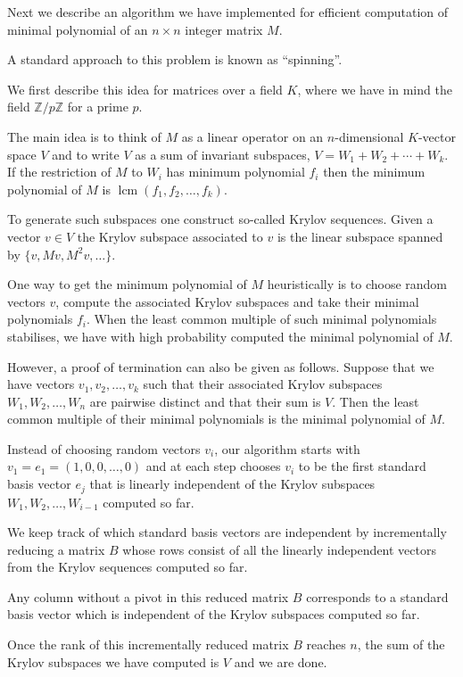 \documentclass{sig-alternate-05-2015}
\DeclareMathOperator{\lcm}{lcm}
\begin{document}
Next we describe an algorithm we have implemented for efficient
computation of minimal polynomial of an $n\times n$ integer matrix $M$.

A standard approach to this problem is known as ``spinning''. 

We first describe this idea for matrices over a field $K$, where we have
in mind the field $\mathbb{Z}/p\mathbb{Z}$ for a prime $p$.

The main idea is to think of $M$ as a linear operator on an $n$-dimensional
$K$-vector space $V$ and to write $V$ as a sum of invariant subspaces, 
$V = W_1 + W_2 + \cdots + W_k$. If the restriction of $M$ to $W_i$ has
minimum polynomial $f_i$ then the minimum polynomial of $M$ is
$\lcm(f_1, f_2, \ldots, f_k)$.

To generate such subspaces one construct so-called Krylov sequences. Given
a vector $v \in V$ the Krylov subspace associated to $v$ is the linear
subspace spanned by $\{v, Mv, M^2v, \ldots\}$.

One way to get the minimum polynomial of $M$ heuristically is to choose
random vectors $v$, compute the associated Krylov subspaces and take their
minimal polynomials $f_i$. When the least common multiple of such minimal
polynomials stabilises, we have with high probability computed the minimal
polynomial of $M$.

However, a proof of termination can also be given as follows. Suppose that
we have vectors $v_1, v_2, \ldots, v_k$ such that their associated Krylov
subspaces $W_1, W_2, \ldots, W_n$ are pairwise distinct and that their
sum is $V$. Then the least common multiple of their minimal polynomials is
the minimal polynomial of $M$.

Instead of choosing random vectors $v_i$, our algorithm starts with
$v_1 = e_1 = (1, 0, 0, \ldots, 0)$ and at each step chooses $v_i$ to be
the first standard basis vector $e_j$ that is linearly independent of the
Krylov subspaces $W_1, W_2, \ldots, W_{i-1}$ computed so far.

We keep track of which standard basis vectors are independent by
incrementally reducing a matrix $B$ whose rows consist of all the
linearly independent vectors from the Krylov sequences computed so
far.

Any column without a pivot in this reduced matrix $B$ corresponds to a
standard basis vector which is independent of the Krylov subspaces
computed so far.

Once the rank of this incrementally reduced matrix $B$ reaches $n$, the sum
of the Krylov subspaces we have computed is $V$ and we are done.
\end{document}
